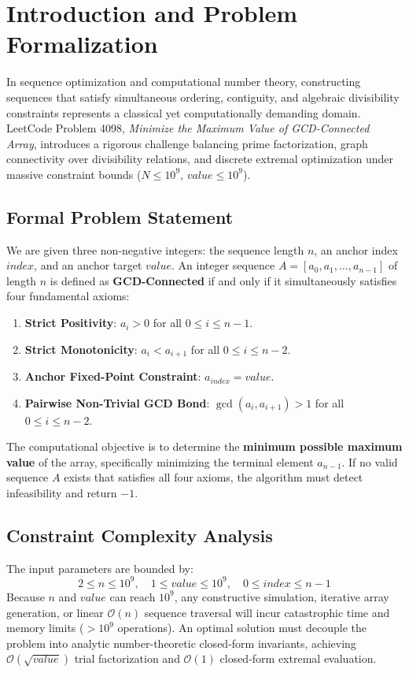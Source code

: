 \documentclass[10pt,journal,compsoc,onecolumn]{IEEEtran}
\begin{document}
\section{Introduction and Problem Formalization}
\label{sec:intro}

In sequence optimization and computational number theory, constructing sequences that satisfy simultaneous ordering, contiguity, and algebraic divisibility constraints represents a classical yet computationally demanding domain. LeetCode Problem 4098, \emph{Minimize the Maximum Value of GCD-Connected Array}, introduces a rigorous challenge balancing prime factorization, graph connectivity over divisibility relations, and discrete extremal optimization under massive constraint bounds ($N \le 10^9$, $value \le 10^9$).

\subsection{Formal Problem Statement}
We are given three non-negative integers: the sequence length $n$, an anchor index $index$, and an anchor target $value$. An integer sequence $A = [a_0, a_1, \dots, a_{n-1}]$ of length $n$ is defined as \textbf{GCD-Connected} if and only if it simultaneously satisfies four fundamental axioms:
\begin{enumerate}
    \item \textbf{Strict Positivity}: $a_i > 0$ for all $0 \le i \le n - 1$.
    \item \textbf{Strict Monotonicity}: $a_i < a_{i+1}$ for all $0 \le i \le n - 2$.
    \item \textbf{Anchor Fixed-Point Constraint}: $a_{index} = value$.
    \item \textbf{Pairwise Non-Trivial GCD Bond}: $\gcd(a_i, a_{i+1}) > 1$ for all $0 \le i \le n - 2$.
\end{enumerate}

The computational objective is to determine the \textbf{minimum possible maximum value} of the array, specifically minimizing the terminal element $a_{n-1}$. If no valid sequence $A$ exists that satisfies all four axioms, the algorithm must detect infeasibility and return $-1$.

\subsection{Constraint Complexity Analysis}
The input parameters are bounded by:
\begin{equation}
2 \le n \le 10^9, \quad 1 \le value \le 10^9, \quad 0 \le index \le n - 1
\end{equation}
Because $n$ and $value$ can reach $10^9$, any constructive simulation, iterative array generation, or linear $\mathcal{O}(n)$ sequence traversal will incur catastrophic time and memory limits ($> 10^9$ operations). An optimal solution must decouple the problem into analytic number-theoretic closed-form invariants, achieving $\mathcal{O}(\sqrt{value})$ trial factorization and $\mathcal{O}(1)$ closed-form extremal evaluation.
\end{document}
